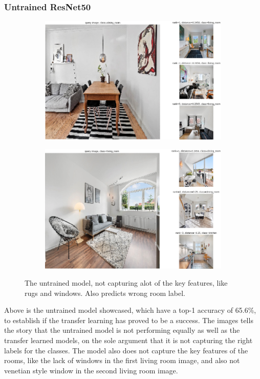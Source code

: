 \subsubsection{Untrained ResNet50}
\begin{figure}[H]
    \centering
    \begin{subfigure}[b]{0.45\textwidth}
      \centering
      \includegraphics[width=\textwidth]{pictures/random/untrainedkitchenplot}
      \label{fig:1}
    \end{subfigure}
    \hfill
    \begin{subfigure}[b]{0.45\textwidth}
      \centering
      \includegraphics[width=\textwidth]{pictures/random/untrainedlivingroom}
      \label{fig:2}
    \end{subfigure}
    \caption{The untrained model, not capturing alot of the key features, like rugs and windows. Also predicts wrong room label.}
\end{figure}
Above is the untrained model showcased, which have a top-1 accuracy of 65.6\%, to establish if the transfer learning has proved to be a success. The images tells the story that the untrained model is not performing equally as well as the transfer learned models, on the sole argument that it is not capturing the right labels for the classes. The model also does not capture the key features of the rooms, like the lack of windows in the first living room image, and also not venetian style window in the second living room image.

